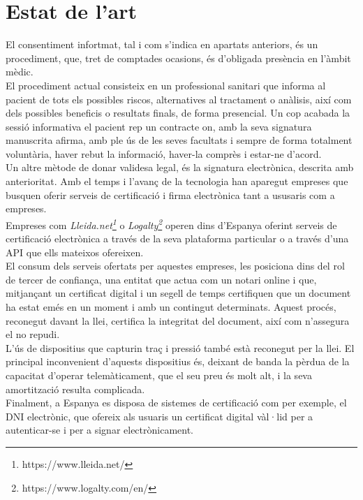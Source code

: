 \section{Estat de l'art}
El consentiment infortmat, tal i com s'indica en apartats anteriors, és un procediment, que, tret de comptades ocasions, és d'obligada presència en l'àmbit mèdic.\\
\newline El procediment actual consisteix en un professional sanitari que informa al pacient de tots els possibles riscos, alternatives al tractament o anàlisis, així com dels possibles beneficis o resultats finals, de forma presencial. Un cop acabada la sessió informativa el pacient rep un contracte on, amb la seva signatura manuscrita afirma, amb ple ús de les seves facultats i sempre de forma totalment voluntària, haver rebut la informació, haver-la comprès i estar-ne d'acord.\\
\newline Un altre mètode de donar validesa legal, és la signatura electrònica, descrita amb anterioritat. Amb el temps i l'avanç de la tecnologia han aparegut empreses que busquen oferir serveis de certificació i firma electrònica tant a ususaris com a empreses.\\
\newline Empreses com \textit{Lleida.net\footnote{https://www.lleida.net/}} o \textit{Logalty\footnote{https://www.logalty.com/en/}} operen dins d'Espanya oferint serveis de certificació electrònica a través de la seva plataforma particular o a través d'una API que ells mateixos ofereixen.\\
\newline El consum dels serveis ofertats per aquestes empreses, les posiciona dins del rol de tercer de confiança, una entitat que actua com un notari online i que, mitjançant un certificat digital i un segell de temps certifiquen que un document ha estat emés en un moment i amb un contingut determinats. 
\newline Aquest procés, reconegut davant la llei, certifica la integritat del document, així com n'assegura el no repudi.\\
\newline L'ús de dispositius que capturin traç i pressió també està reconegut per la llei. El principal inconvenient d'aquests dispositius és, deixant de banda la pèrdua de la capacitat d'operar telemàticament, que el seu preu és molt alt, i la seva amortització resulta complicada.\\
\newline Finalment, a Espanya es disposa de sistemes de certificació com per exemple, el DNI electrònic, que ofereix als usuaris un certificat digital vàl·lid per a autenticar-se i per a signar electrònicament.
